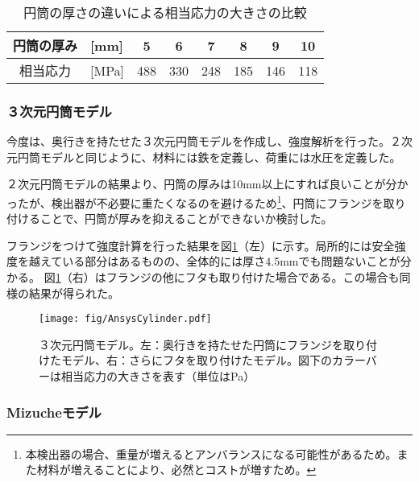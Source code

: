 \documentclass[11pt]{ltjsreport}
\newcommand{\figref}[1]{図\ref{#1}}
\newcommand{\tabref}[1]{表\ref{#1}}
\begin{document}
\begin{table}[htbp]
\caption[円筒の厚さの違いによる相当応力の大きさの比較]{円筒の厚さの違いによる相当応力の大きさの比較}
\begin{center}
\begin{tabular}{clcccccc}
\hline \hline
円筒の厚み & [mm] & 5 & 6 & 7 & 8 & 9 & 10 \\
\hline
相当応力 & [MPa] & 488 & 330 & 248 & 185 & 146 & 118\\
\hline \hline
\end{tabular}
\end{center}
\label{Ansys2DResult}
\end{table}%


\subsubsection{３次元円筒モデル}
今度は、奥行きを持たせた３次元円筒モデルを作成し、強度解析を行った。２次元円筒モデルと同じように、材料には鉄を定義し、荷重には水圧を定義した。

２次元円筒モデルの結果より、円筒の厚みは10mm以上にすれば良いことが分かったが、検出器が不必要に重たくなるのを避けるため\footnote{本検出器の場合、重量が増えるとアンバランスになる可能性があるため。また材料が増えることにより、必然とコストが増すため。}、円筒にフランジを取り付けることで、円筒が厚みを抑えることができないか検討した。

フランジをつけて強度計算を行った結果を\figref{AnsysCylinder}（左）に示す。局所的には安全強度を越えている部分はあるものの、全体的には厚さ4.5mmでも問題ないことが分かる。
\figref{AnsysCylinder}（右）はフランジの他にフタも取り付けた場合である。この場合も同様の結果が得られた。

\begin{figure}[htbp]
\centering
\texttt{[image: fig/AnsysCylinder.pdf]}
\caption[３次元円筒モデル]{３次元円筒モデル。左：奥行きを持たせた円筒にフランジを取り付けたモデル、右：さらにフタを取り付けたモデル。図下のカラーバーは相当応力の大きさを表す（単位はPa）}
\label{AnsysCylinder}
\end{figure}

\subsubsection{Mizucheモデル}
\end{document}
